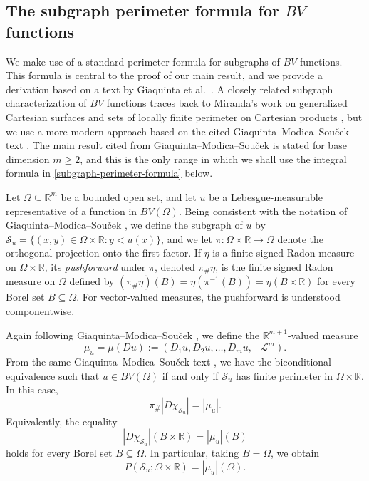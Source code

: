 \documentclass[10pt,a4paper]{amsart}
\begin{document}
\subsection{The subgraph perimeter formula for \(BV\) functions}\label{subsec:subgraph-perimeter-formula}
 We make use of a standard perimeter formula for subgraphs of \(BV\) functions.
 This formula is central to the proof of our main result, and we provide a derivation based 
 on a text by Giaquinta et al.\ \cite[\S4.1.5]{GiaquintaModicaSoucek1998}.
 A closely related subgraph characterization of \(BV\) functions traces back 
 to Miranda's work on generalized Cartesian surfaces and sets of locally finite perimeter on Cartesian products \cite{Miranda1964}, 
 but we use a more modern approach based on the cited Giaquinta--Modica--Sou\v{c}ek text
 \cite[\S4.1.5]{GiaquintaModicaSoucek1998}. 
 The main result cited from Giaquinta--Modica--Sou\v{c}ek is stated for base
 dimension \(m\ge2\), and this is the only range in which we shall use the integral formula in \eqref{subgraph-perimeter-formula} below. 

 Let $\Omega\subseteq \mathbb R^m$ be a bounded open set, and let $u$ be a Lebesgue-measurable representative of a function in $ BV(\Omega)$. Being consistent with the notation of 
 Giaquinta--Modica--Sou\v{c}ek \cite[p.\ 371]{GiaquintaModicaSoucek1998}, we define the subgraph of \(u\) by
$
\mathcal S_u
=
\{(x,y)\in\Omega\times\mathbb R:y<u(x)\}$, 
 and we let 
$
\pi:\Omega\times\mathbb R\to\Omega $ 
denote the orthogonal projection onto the first factor.
 If \(\eta\) is a finite signed Radon measure on
\(\Omega\times\mathbb R\), its \emph{pushforward} under \(\pi\), denoted
\(\pi_{\#}\eta\), is the finite signed Radon measure on \(\Omega\) defined by
$
(\pi_{\#}\eta)(B)
=
\eta(\pi^{-1}(B))
=
\eta(B\times\mathbb R)
$
 for every Borel set \(B\subseteq\Omega\). For vector-valued measures, the
 pushforward is understood componentwise.

 Again following Giaquinta--Modica--Sou\v{c}ek \cite[p.\ 371]{GiaquintaModicaSoucek1998}, 
 we define the \(\mathbb R^{m+1}\)-valued measure
\begin{equation}\label{muDu}
\mu_u
=
\mu(Du)
:=
(D_1u, D_2u, \ldots,D_m u,-\mathcal L^m).
\end{equation}
 From the same Giaquinta--Modica--Sou\v{c}ek text \cite[\S4.1.5, Theorem~1]{GiaquintaModicaSoucek1998}, we have the biconditional equivalence
 such that \(u\in BV(\Omega)\)
if and only if \(\mathcal S_u\) has finite perimeter in
\(\Omega\times\mathbb R\). In this case, 
\begin{equation}\label{GMS-pushforward}
\pi_{\#}|D\chi_{\mathcal S_u}|
=
|\mu_u|.
\end{equation}
Equivalently, the equality 
\begin{equation}\label{local-subgraph-perimeter-measure}
|D\chi_{\mathcal S_u}|(B\times\mathbb R)
=
|\mu_u|(B) 
\end{equation}
 holds for every Borel set \(B\subseteq\Omega\). 
 In particular, taking \(B=\Omega\), we obtain
\begin{equation}\label{subgraph-perimeter-vector-measure}
P(\mathcal S_u;\Omega\times\mathbb R)
=
|\mu_u|(\Omega).
\end{equation}
\end{document}
